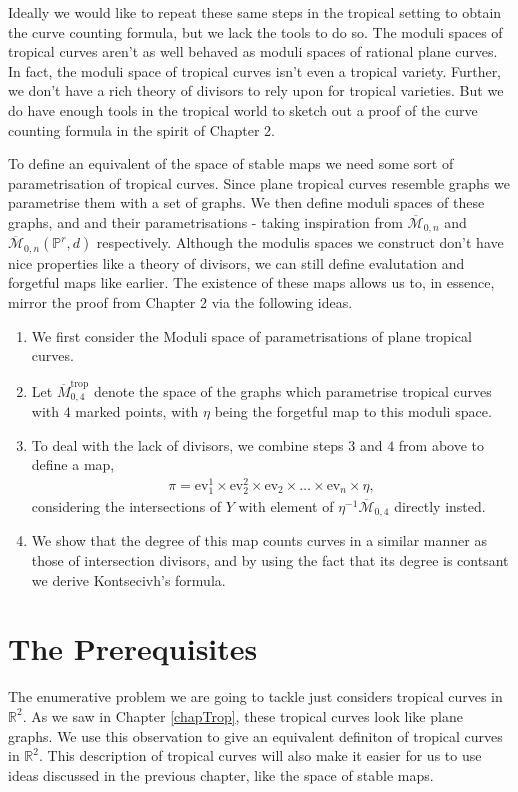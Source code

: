 Ideally we would like to repeat these same steps in the tropical setting to obtain the curve counting formula, but we lack the tools to do so.
The moduli spaces of tropical curves aren't as well behaved as moduli spaces of rational plane curves.
In fact, the moduli space of tropical curves isn't even a tropical variety.
Further, we don't have a rich theory of divisors to rely upon for tropical varieties. 
But we do have enough tools in the tropical world to sketch out a proof of the curve counting formula in the spirit of Chapter 2.
\par To define an equivalent of the space of stable maps we need some sort of parametrisation of tropical curves. 
Since plane tropical curves resemble graphs we parametrise them with a set of graphs.
We then define moduli spaces of these graphs, and and their parametrisations - taking inspiration from $\overline{\mathcal{M}}_{0,n}$ and $\overline{\mathcal{M}}_{0,n}(\mathbb{P}^{r},d)$ respectively.
Although the modulis spaces we construct don't have nice properties like a theory of divisors, we can still define evalutation and forgetful maps like earlier.
The existence of these maps allows us to, in essence, mirror the proof from Chapter 2 via the following ideas.
\begin{enumerate}
    \item We first consider the Moduli space of parametrisations of plane tropical curves.
    \item Let $\overline{M}_{0,4}^{\text{trop}}$ denote the space of the graphs which parametrise tropical curves with $4$ marked points, with $\eta$ being the forgetful map to this moduli space.
    \item To deal with the lack of divisors, we combine steps $3$ and $4$ from above to define a map,
        \begin{align*}
            \pi = \text{ev}_{1}^{1} \times \text{ev}_{2}^{2} \times \text{ev}_{2} \times \dots \times \text{ev}_{n} \times \eta,
        \end{align*}
        considering the intersections of $Y$ with element of $\eta^{-1}\overline{\mathcal{M}}_{0,4}$ directly insted.
    \item We show that the degree of this map counts curves in a similar manner as those of intersection divisors, and by using the fact that its degree is contsant we derive Kontsecivh's formula.
\end{enumerate}

\section{The Prerequisites}
The enumerative problem we are going to tackle just considers tropical curves in $\mathbb{R}^{2}$.
As we saw in Chapter \ref{chapTrop}, these tropical curves look like plane graphs.
We use this observation to give an equivalent definiton of tropical curves in $\mathbb{R}^{2}$.
This description of tropical curves will also make it easier for us to use ideas discussed in the previous chapter, like the space of stable maps.

